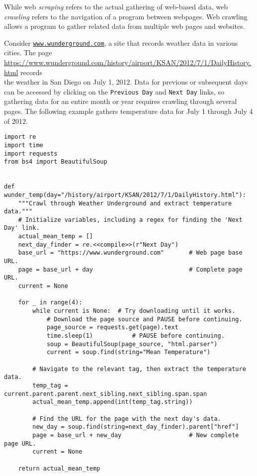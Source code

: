 While web \emph{scraping} refers to the actual gathering of web-based data, web \emph{crawling} refers to the navigation of a program between webpages.
Web crawling allows a program to gather related data from multiple web pages and websites.

Consider \href{https://www.wunderground.com}{\texttt{www.wunderground.com}}, a site that records weather data in various cities.
The page \url{https://www.wunderground.com/history/airport/KSAN/2012/7/1/DailyHistory.html} records\\the weather in San Diego on July 1, 2012.
Data for previous or subsequent days can be accessed by clicking on the \texttt{Previous Day} and \texttt{Next Day} links, so gathering data for an entire month or year requires crawling through several pages.
The following example gathers temperature data for July 1 through July 4 of 2012.

\begin{lstlisting}
import re
import time
import requests
from bs4 import BeautifulSoup


def wunder_temp(day="/history/airport/KSAN/2012/7/1/DailyHistory.html"):
    """Crawl through Weather Underground and extract temperature data."""
    # Initialize variables, including a regex for finding the 'Next Day' link.
    actual_mean_temp = []
    next_day_finder = re.<<compile>>(r"Next Day")
    base_url = "https://www.wunderground.com"       # Web page base URL.
    page = base_url + day                           # Complete page URL.
    current = None

    for _ in range(4):
        while current is None:  # Try downloading until it works.
            # Download the page source and PAUSE before continuing.
            page_source = requests.get(page).text
            time.sleep(1)           # PAUSE before continuing.
            soup = BeautifulSoup(page_source, "html.parser")
            current = soup.find(string="Mean Temperature")

        # Navigate to the relevant tag, then extract the temperature data.
        temp_tag = current.parent.parent.next_sibling.next_sibling.span.span
        actual_mean_temp.append(int(temp_tag.string))

        # Find the URL for the page with the next day's data.
        new_day = soup.find(string=next_day_finder).parent["href"]
        page = base_url + new_day                   # New complete page URL.
        current = None

    return actual_mean_temp
\end{lstlisting}

